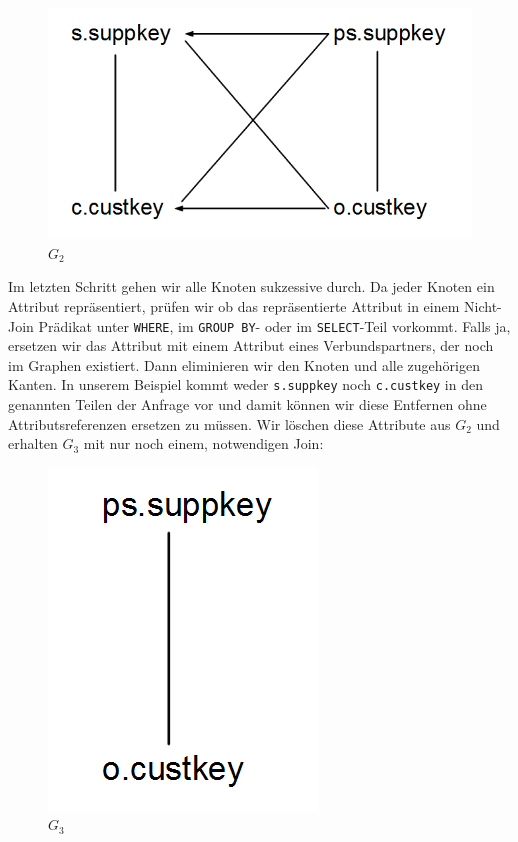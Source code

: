 \begin{figure}[H]
\centering
\includegraphics[scale=0.4]{Bilder/joinelem_g2.png}
\caption{$G_2$}
\end{figure}

Im letzten Schritt gehen wir alle Knoten sukzessive durch. Da jeder Knoten ein Attribut repräsentiert, prüfen wir ob das repräsentierte Attribut in einem Nicht-Join Prädikat unter \verb|WHERE|, im \verb|GROUP BY|- oder im \verb|SELECT|-Teil vorkommt. Falls ja, ersetzen wir das Attribut mit einem Attribut eines Verbundspartners, der noch im Graphen existiert. Dann eliminieren wir den Knoten und alle zugehörigen Kanten. In unserem Beispiel kommt weder \verb|s.suppkey| noch \verb|c.custkey| in den genannten Teilen der Anfrage vor und damit können wir diese Entfernen ohne Attributsreferenzen ersetzen zu müssen. Wir löschen diese Attribute aus $G_2$ und erhalten $G_3$ mit nur noch einem, notwendigen Join:

\begin{figure}[H]
\centering
\includegraphics[scale=0.4]{Bilder/joinelem_g3.png}
\caption{$G_3$}
\end{figure}

